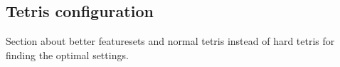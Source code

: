\subsection{Tetris configuration}

Section about better featuresets and normal tetris instead of hard tetris
for finding the optimal settings.
